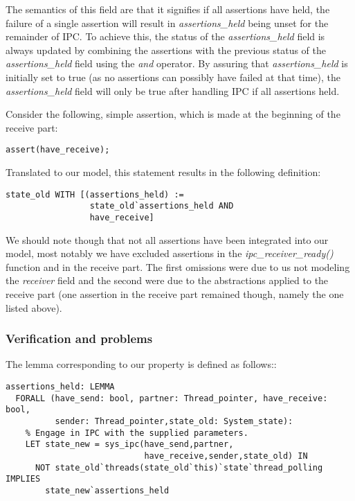 The semantics of this field are that it signifies if all assertions have held, the failure of a single assertion will result in \emph{assertions\_held} being unset for the remainder of IPC. To achieve this, the status of the \emph{assertions\_held} field is always updated by combining the assertions with the previous status of the \emph{assertions\_held} field using the \emph{and} operator. By assuring that \emph{assertions\_held} is initially set to true (as no assertions can possibly have failed at that time), the \emph{assertions\_held} field will only be true after handling IPC if all assertions held.\emptyline

Consider the following, simple assertion, which is made at the beginning of the receive part:

\lstset{language=PVS}
\begin{lstlisting}[caption={C++: \emph{have\_receive} assertion.}]
assert(have_receive);
\end{lstlisting}

Translated to our model, this statement results in the following definition:

\lstset{language=PVS}
\begin{lstlisting}[caption={PVS: \emph{have\_receive} assertion.}]
% Assert that at this point the <have_receive> parameter is true.
state_old WITH [(assertions_held) := 
                 state_old`assertions_held AND
                 have_receive]
\end{lstlisting}

We should note though that not all assertions have been integrated into our model, most notably we have excluded assertions in the \emph{ipc\_receiver\_ready()} function and in the receive part. The first omissions were due to us not modeling the \emph{receiver} field and the second were due to the abstractions applied to the receive part (one assertion in the receive part remained though, namely the one listed above).

\subsubsection{Verification and problems}
The lemma corresponding to our property is defined as follows::

\lstset{language=PVS}
\begin{lstlisting}[caption={PVS: property 3, formal definition.}]
% The various assertions in the code should hold after engaging in IPC.
assertions_held: LEMMA
  FORALL (have_send: bool, partner: Thread_pointer, have_receive: bool,
          sender: Thread_pointer,state_old: System_state):
    % Engage in IPC with the supplied parameters.
    LET state_new = sys_ipc(have_send,partner,
                            have_receive,sender,state_old) IN
      NOT state_old`threads(state_old`this)`state`thread_polling IMPLIES
        state_new`assertions_held
\end{lstlisting}

